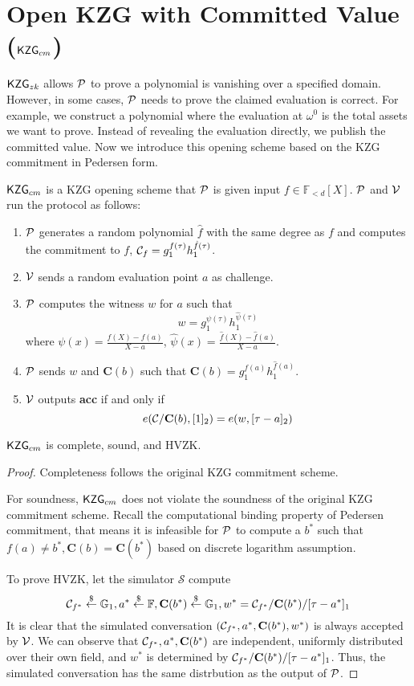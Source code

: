 \section{Open KZG with Committed Value ($\kzgcm$)}
\label{sec:kzgOpenComm}
$\mathsf{KZG}_{zk}$ allows $\mathcal{P}$ to prove a polynomial is vanishing over a specified domain. However, in some cases, $\mathcal{P}$ needs to prove the claimed evaluation is correct. For example, we construct a polynomial where the evaluation at $\omega^0$ is the total assets we want to prove. Instead of revealing the evaluation directly, we publish the committed value. Now we introduce this opening scheme based on the KZG commitment in Pedersen form.
\begin{definition}[$\kzgcm$]
$\kzgcm$ is a KZG opening scheme that $\mathcal{P}$ is given input $f\in\mathbb{F}_{<d}[X]$. $\mathcal{P}$ and $\mathcal{V}$ run the protocol as follows:
\begin{enumerate}
    \item $\mathcal{P}$ generates a random polynomial $\hat{f}$ with the same degree as $f$ and computes the commitment to $f$, $\mathcal{C}_f=g_1^{f(\tau)}h_1^{\hat{f}(\tau)}$.
    \item $\mathcal{V}$ sends a random evaluation point $a$ as challenge.
    \item $\mathcal{P}$ computes the witness $w$ for $a$ such that
    \[ w=g_1^{\psi(\tau)}h_1^{\hat\psi(\tau)} \]
    where $\psi(x)=\frac{f(X)-f(a)}{X-a}$, $\hat\psi(x)=\frac{\hat{f}(X)-\hat{f}(a)}{X-a}$.
    \item $\mathcal{P}$ sends $w$ and $\textbf{C}(b)$ such that $\textbf{C}(b)=g_1^{f(a)}h_1^{\hat{f}(a)}$.
    \item $\mathcal{V}$ outputs \textbf{acc} if and only if
    \[ e(\mathcal{C}/\textbf{C}(b),[1]_2)=e(w,[\tau-a]_2) \]
\end{enumerate}
\end{definition}
\begin{theorem}
\label{thm:kzgcm}
$\kzgcm$ is complete, sound, and HVZK.
\end{theorem}
\begin{proof}
Completeness follows the original KZG commitment scheme.

For soundness, $\kzgcm$ does not violate the soundness of the original KZG commitment scheme. Recall the computational binding property of Pedersen commitment, that means it is infeasible for $\mathcal{P}$ to compute a $b^*$ such that $f(a)\ne{b^*},\textbf{C}(b)=\textbf{C}(b^*)$ based on discrete logarithm assumption.

To prove HVZK, let the simulator $\mathcal{S}$ compute
$$
\mathcal{C}_{f^*}\stackrel{\$}{\leftarrow}\mathbb{G}_1,a^*\stackrel{\$}{\leftarrow}\mathbb{F},\textbf{C}(b^*)\stackrel{\$}{\leftarrow}\mathbb{G}_1,w^*=\mathcal{C}_{f^*}/\textbf{C}(b^*)/[\tau-a^*]_1
$$
It is clear that the simulated conversation $(\mathcal{C}_{f^*},a^*,\textbf{C}(b^*),w^*)$  is always accepted by $\mathcal{V}$. We can observe that $\mathcal{C}_{f^*},a^*,\textbf{C}(b^*)$ are independent, uniformly distributed over their own field, and $w^*$ is determined by $\mathcal{C}_{f^*}/\textbf{C}(b^*)/[\tau-a^*]_1$. Thus, the simulated conversation has the same distrbution as the output of $\mathcal{P}$.
\end{proof}

